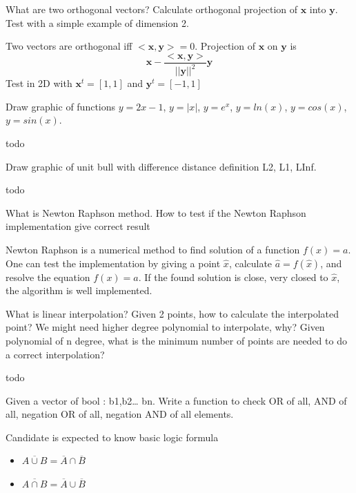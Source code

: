 \documentclass{exam}%
\newcommand*{\ANCOASTAT}{}%
\newcommand{\mathvec}[1]{\textbf{#1}}
\begin{document}
\begin{questions}
\question What are two orthogonal vectors? Calculate orthogonal projection of $\mathvec{x}$ into $\mathvec{y}$. Test with a simple example of dimension 2. 
\begin{solution}[.2in]
Two vectors are orthogonal iff $<\mathvec{x},\mathvec{y}>=0$. Projection of $\mathvec{x}$ on $\mathvec{y}$ is
\[
\mathvec{x} - \frac{<\mathvec{x},\mathvec{y}>}{||\mathvec{y}||^2} \mathvec{y}
\]
Test in 2D with $\mathvec{x}^t=[1,1]$ and $\mathvec{y}^t=[-1,1]$
\end{solution}

\question Draw graphic of functions $y=2x-1$, $y=|x|$, $y=e^x$, $y=ln(x)$, $y=cos(x)$, $y=sin(x)$.
\begin{solution}[.2in]
	todo
\end{solution}

\question Draw graphic of unit bull with difference distance definition L2, L1, LInf.
\begin{solution}[.2in]
	todo
\end{solution}

\question What is Newton Raphson method. How to test if the Newton Raphson implementation give correct result
\begin{solution}[.2in]
Newton Raphson is a numerical method to find solution of a function $f(x)=a$. One can test the implementation by giving a point $\hat{x}$, calculate $\hat{a}=f(\hat{x})$, and resolve the equation $f(x)=\hat{a}$. If the found solution is close, very closed to $\hat{x}$, the algorithm is well implemented.
\end{solution}

\question What is linear interpolation? Given 2 points, how to calculate the interpolated point? We might need higher degree polynomial to interpolate, why? Given polynomial of n degree, what is the minimum number of points are needed to do a correct interpolation?
\begin{solution}[.2in]
	todo
\end{solution}

\question Given a vector of bool : b1,b2… bn. Write a function to check OR of all, AND of all, negation OR of all, negation AND of all elements.
\begin{solution}[.2in]
Candidate is expected to know basic logic formula 
\begin{itemize}
	\item $\overline{A\cup B} = \overline{A}\cap \overline{B}$
    \item $\overline{A\cap B} = \overline{A}\cup \overline{B}$
\end{itemize}
\end{solution}


\end{questions}
\fi
\ifdefined\ANCOASTAT
\newpage
\end{document}
